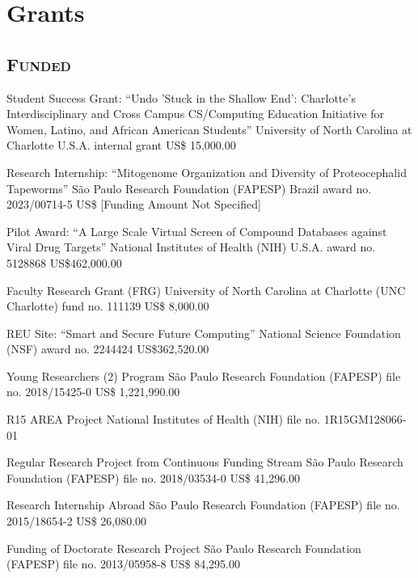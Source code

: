 \documentclass[11pt, letterpaper, sans]{moderncv}
\begin{document}

\section{Grants}

\vspace{.5em}
	\subsection{\textsc{Funded}}
\vspace{.5em}

{Student Success Grant: ``Undo 'Stuck in the Shallow End': Charlotte’s Interdisciplinary and Cross Campus CS/Computing Education Initiative for Women, Latino, and African American Students''}
{University of North Carolina at Charlotte}
{U.S.A.}
{internal grant}
{US\$ 15,000.00}{}

{Research Internship: ``Mitogenome Organization and Diversity of Proteocephalid Tapeworms''}
{São Paulo Research Foundation (FAPESP)}
{Brazil}
{award no. 2023/00714-5}
{US\$ [Funding Amount Not Specified]}{}

{Pilot Award: ``A Large Scale Virtual Screen of Compound Databases against Viral Drug Targets''}
{National Institutes of Health (NIH)}
{U.S.A.}
{award no. 5128868}
{US\$462,000.00}{}

{Faculty Research Grant (FRG)}
{University of North Carolina at Charlotte (UNC Charlotte)}
{fund no. 111139}
{US\$ 8,000.00}{}

{REU Site: ``Smart and Secure Future Computing''}
{National Science Foundation (NSF)}
{award no. 2244424}
{US\$362,520.00}{}

{Young Researchers (2) Program}
{São Paulo Research Foundation (FAPESP)}
{file no. 2018/15425-0}
{US\$ 1,221,990.00}{}

{R15 AREA Project}
{National Institutes of Health (NIH)}
{file no. 1R15GM128066-01}
{}{}

{Regular Research Project from Continuous Funding Stream}
{São Paulo Research Foundation (FAPESP)}
{file no. 2018/03534-0}
{US\$ 41,296.00}{}

{Research Internship Abroad}
{São Paulo Research Foundation (FAPESP)}
{file no. 2015/18654-2}
{US\$ 26,080.00}{}

{Funding of Doctorate Research Project}
{São Paulo Research Foundation (FAPESP)}
{file no. 2013/05958-8}
{US\$ 84,295.00}{}
\end{document}
